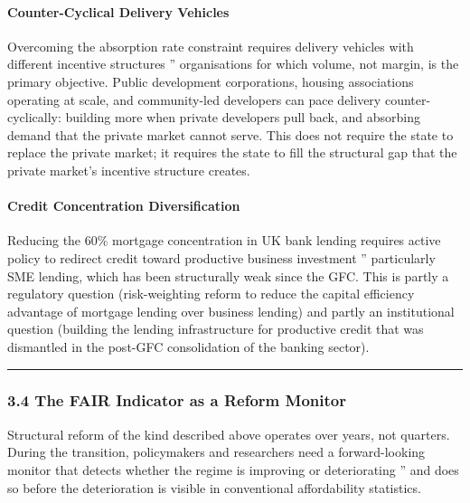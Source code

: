 \documentclass[
]{article}
\begin{document}
\paragraph{Counter-Cyclical Delivery
Vehicles}\label{counter-cyclical-delivery-vehicles}

Overcoming the absorption rate constraint requires delivery vehicles
with different incentive structures '' organisations for which volume,
not margin, is the primary objective. Public development corporations,
housing associations operating at scale, and community-led developers
can pace delivery counter- cyclically: building more when private
developers pull back, and absorbing demand that the private market
cannot serve. This does not require the state to replace the private
market; it requires the state to fill the structural gap that the
private market's incentive structure creates.

\paragraph{Credit Concentration
Diversification}\label{credit-concentration-diversification}

Reducing the 60\% mortgage concentration in UK bank lending requires
active policy to redirect credit toward productive business investment
'' particularly SME lending, which has been structurally weak since the
GFC. This is partly a regulatory question (risk-weighting reform to
reduce the capital efficiency advantage of mortgage lending over
business lending) and partly an institutional question (building the
lending infrastructure for productive credit that was dismantled in the
post-GFC consolidation of the banking sector).

\begin{center}\rule{0.5\linewidth}{0.5pt}\end{center}

\subsubsection{3.4 The FAIR Indicator as a Reform
Monitor}\label{the-fair-indicator-as-a-reform-monitor}

Structural reform of the kind described above operates over years, not
quarters. During the transition, policymakers and researchers need a
forward-looking monitor that detects whether the regime is improving or
deteriorating '' and does so before the deterioration is visible in
conventional affordability statistics.
\end{document}

